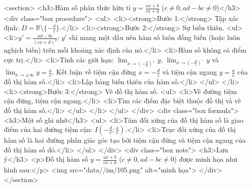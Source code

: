     <section>
        <h3>Hàm số phân thức hữu tỉ \(y=\frac{ax+b}{cx+d}\) (\(c \ne 0, ad-bc \ne 0\))</h3>
        <div class="box procedure">
            <ul>
                <li><strong>Bước 1:</strong> Tập xác định: \(D = \mathbb{R} \setminus \{-\frac{d}{c}\}\).</li>
                <li><strong>Bước 2:</strong> Sự biến thiên.
                    <ul>
                        <li>\(y' = \frac{ad-bc}{(cx+d)^2}\); \(y'\) chỉ mang một dấu nên hàm số luôn đồng biến (hoặc luôn nghịch biến) trên mỗi khoảng xác định của nó.</li>
                        <li>Hàm số không có điểm cực trị.</li>
                        <li>Tính các giới hạn: \(\lim_{x \to (-\frac{d}{c})^+} y\), \(\lim_{x \to (-\frac{d}{c})^-} y\) và \(\lim_{x \to \pm\infty} y = \frac{a}{c}\). Kết luận về tiệm cận đứng \(x=-\frac{d}{c}\) và tiệm cận ngang \(y=\frac{a}{c}\) của đồ thị hàm số.</li>
                        <li>Lập bảng biến thiên của hàm số.</li>
                    </ul>
                </li>
                <li><strong>Bước 3:</strong> Vẽ đồ thị hàm số.
                    <ul>
                        <li>Vẽ đường tiệm cận đứng, tiệm cận ngang.</li>
                        <li>Tìm các điểm đặc biệt thuộc đồ thị và vẽ đồ thị hàm số.</li>
                    </ul>
                </li>
            </ul>
        </div>
        <div class="box formula">
            <h3>Một số ghi nhớ</h3>
            <ul>
                <li>Tâm đối xứng của đồ thị hàm số là giao điểm của hai đường tiệm cận: \(I(-\frac{d}{c}; \frac{a}{c})\).</li>
                <li>Trục đối xứng của đồ thị hàm số là hai đường phân giác góc tạo bởi tiệm cận đứng và tiệm cận ngang của đồ thị hàm số đó.</li>
            </ul>
        </div>
        <div class="box note">
            <h3>Lưu ý</h3>
            <p>Đồ thị hàm số \(y=\frac{ax+b}{cx+d}\) (\(c \ne 0, ad-bc \ne 0\)) được minh họa như hình sau:</p>
            <img src="data//im/105.png" alt="minh họa">
        </div>
    </section>

